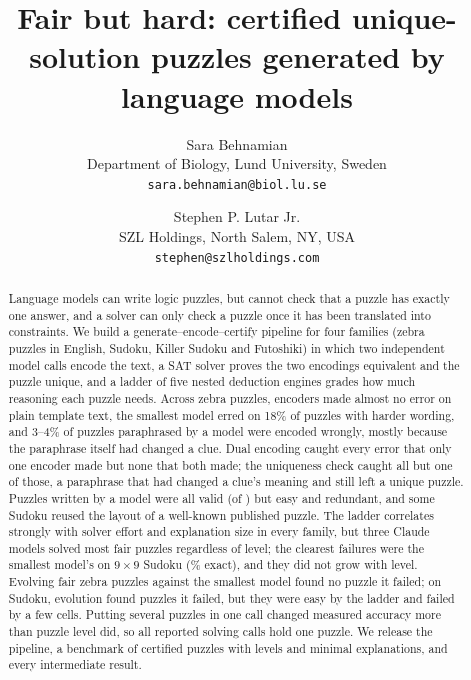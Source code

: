 \documentclass[10pt,twocolumn]{article}
\title{Fair but hard: certified unique-solution puzzles generated by language models}
\author{Sara Behnamian\\[2pt]
\small Department of Biology, Lund University, Sweden\\
\small \texttt{sara.behnamian@biol.lu.se}
\and Stephen P. Lutar Jr.\\[2pt]
\small SZL Holdings, North Salem, NY, USA\\
\small \texttt{stephen@szlholdings.com}}
\date{}
\begin{document}
\maketitle

\begin{abstract}
Language models can write logic puzzles, but cannot check that a puzzle has exactly one answer, and a solver can only check a puzzle once it has been translated into constraints. We build a generate--encode--certify pipeline for four families (zebra puzzles in English, Sudoku, Killer Sudoku and Futoshiki) in which two independent model calls encode the text, a SAT solver proves the two encodings equivalent and the puzzle unique, and a ladder of five nested deduction engines grades how much reasoning each puzzle needs. Across \EOneN zebra puzzles, encoders made almost no error on plain template text, the smallest model erred on 18\% of puzzles with harder wording, and 3--4\% of puzzles paraphrased by a model were encoded wrongly, mostly because the paraphrase itself had changed a clue. Dual encoding caught every error that only one encoder made but none that both made; the uniqueness check caught all but one of those, a paraphrase that had changed a clue's meaning and still left a unique puzzle. Puzzles written by a model were all valid (\ETwoValid of \ETwoN) but easy and redundant, and some Sudoku reused the layout of a well-known published puzzle. The ladder correlates strongly with solver effort and explanation size in every family, but three Claude models solved most fair puzzles regardless of level; the clearest failures were the smallest model's on $9{\times}9$ Sudoku (\EThreeSudokuHaiku\% exact), and they did not grow with level. Evolving fair zebra puzzles against the smallest model found no puzzle it failed; on Sudoku, evolution found puzzles it failed, but they were easy by the ladder and failed by a few cells. Putting several puzzles in one call changed measured accuracy more than puzzle level did, so all reported solving calls hold one puzzle. We release the pipeline, a benchmark of certified puzzles with levels and minimal explanations, and every intermediate result.
\end{abstract}





\end{document}
